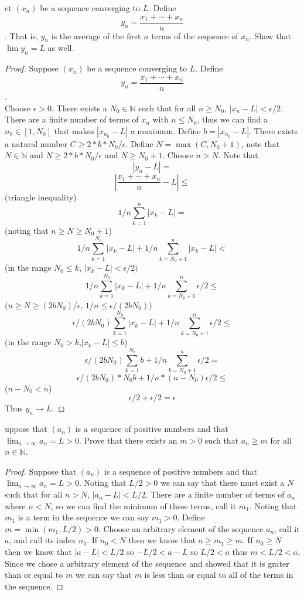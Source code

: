 \documentclass[12pt]{article}
\makeatletter
\theoremstyle{homework}
\newenvironment{exercise}[1]
{\def\@currentlabel{#1}\exercisecore}
{\endexercisecore}
\makeatother
\begin{document}
\begin{exercise}

Let $(x_n)$ be a sequence converging to $L$. Define $$y_n =\frac{x_1 + \cdots + x_n}{n}$$.
That is, $y_n$ is the average of the first $n$ terms of the sequence of $x_n$. Show that $\lim y_n = L$ as well.
\end{exercise}
\begin{proof}
Suppose $(x_n)$ be a sequence converging to $L$. Define $$y_n =\frac{x_1 + \cdots + x_n}{n}$$.\\
Choose $\epsilon>0$.  There exists a $N_0\in \mathbb{N}$ such that for all $n\geq N_0$, $|x_n-L|<\epsilon/2$.  There are a finite number of terms of $x_n$ with $n\leq N_0$, thus we can find a $n_0\in [1,N_0]$ that makes $|x_{n_0}-L|$ a maximum.  Define $b=|x_{n_0}-L|$.  There exists a natural number $C\geq 2*b*N_0/\epsilon$.  Define $N=\max(C ,N_0+1)$, note that $N\in\mathbb{N}$ and $N\geq 2*b*N_0/\epsilon$ and $N\geq N_0+1$.  Choose $n>N$.  Note that 
$$|y_n-L|=$$
$$|\frac{x_1 + \cdots + x_n}{n}-L|\leq$$(triangle inequality) 
$$1/n\sum^{n}_{k=1}|x_k-L|=$$ (noting that $n\geq N\geq N_0+1$)
$$1/n\sum^{N_0}_{k=1}|x_k-L|+1/n\sum^{n}_{k=N_0+1}|x_k-L|<$$ (in the range $N_0\leq k$, $|x_k-L|<\epsilon/2)$
$$1/n\sum^{N_0}_{k=1}|x_k-L|+1/n\sum^{n}_{k=N_0+1}\epsilon/2\leq $$ ($n\geq N\geq (2bN_0)/\epsilon$, $1/n\leq \epsilon/(2bN_0)$)
$$\epsilon/(2bN_0) \sum^{N_0}_{k=1}|x_k-L|+1/n\sum^{n}_{k=N_0+1}\epsilon/2\leq$$
(in the range $N_0>k$,$|x_k-L|\leq b$)
$$\epsilon/(2bN_0) \sum^{N_0}_{k=1}b+1/n\sum^{n}_{k=N_0+1}\epsilon/2=$$
$$\epsilon/(2bN_0) *N_0b+1/n*(n-N_0)\epsilon/2\leq$$($n-N_0<n$)
$$\epsilon/2+\epsilon/2=\epsilon$$
Thus $y_n\rightarrow L$.
\end{proof}
\begin{exercise}

Suppose that $(a_n)$ is a sequence of positive numbers and that $\lim_{n\rightarrow \infty} a_n = L > 0$. Prove that there exists an $m > 0$ such that $a_n \geq m$ for all $n \in \mathbb{N}$.
\end{exercise}
\begin{proof}
Suppose that $(a_n)$ is a sequence of positive numbers and that $\lim_{n\rightarrow \infty} a_n = L > 0$.  Noting that $L/2>0$ we can say that there must exist a $N$ such that for all $n>N$, $|a_n-L|<L/2$.  There are a finite number of terms of $a_n$ where $n<N$, so we can find the minimum of these terms, call it $m_1$.  Noting that $m_1$ is a term in the sequence we can say $m_1>0$.  Define $m=\min(m_1,L/2)>0$.  Choose an arbitrary element of the sequence $a_n$, call it $a$, and call its index $n_0$.  If $n_0<N$ then we know that $a\geq m_1\geq m$.  If $n_0\geq N$ then we know that $|a-L|<L/2$ so $-L/2<a-L$ so $L/2<a$ thus $m<L/2<a$.  Since we chose a arbitrary element of the sequence and showed that it is grater than or equal to $m$ we can say that $m$ is less than or equal to all of the terms in the sequence. 
\end{proof}
\end{document}
